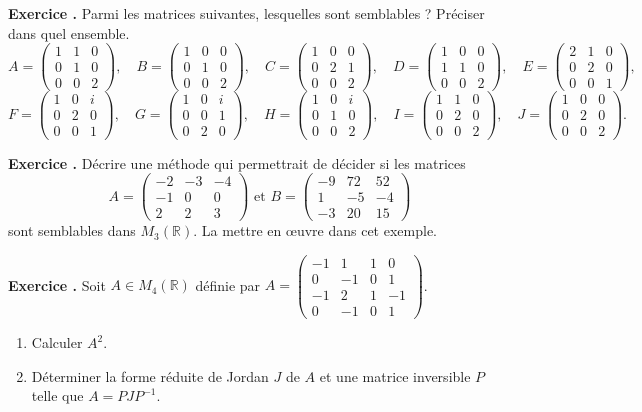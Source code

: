 \documentclass[10pt,a4paper]{article}
\def\bf#1{\textbf{#1}}
\newcounter{nexo}
\newcommand{\exo}{\medskip\noindent \bf{ Exercice \thenexo. \stepcounter{nexo}}}
\def\be{\begin{enumerate}}
\def\ee{\end{enumerate}}
\def\R{\mathbb{R}}
\def\mat#1{\begin{pmatrix}#1\end{pmatrix}}
\begin{document}
\exo
Parmi les matrices suivantes, lesquelles sont semblables ? Préciser dans quel ensemble.
%
\begin{equation*}
 A=\mat{1&1&0\\
0&1&0\\
0&0&2}, \quad
B = \mat{1&0&0\\
0&1&0\\
0&0&2},\quad
C = \mat{1&0&0\\
0&2&1\\
0&0&2},\quad
D = \mat{1&0&0\\
1&1&0\\
0&0&2},\quad
E = \mat{2&1&0\\
0&2&0\\
0&0&1},
\end{equation*}
\begin{equation*}
F = \mat{1&0&i\\
0&2&0\\
0&0&1},\quad
G = \mat{1&0&i\\
0&0&1\\
0&2&0},\quad
H = \mat{1&0&i\\
0&1&0\\
0&0&2},\quad
I =  \mat{1&1&0\\
0&2&0\\
0&0&2},\quad
J = \mat{1&0&0\\
0&2&0\\
0&0&2}.
\end{equation*}


\exo Décrire une méthode qui permettrait de décider si les matrices \\
%
\begin{equation*}
 A = \mat{-2&-3&-4\\
-1&0&0\\
2&2&3}
\mbox{ et }
B=\mat{-9&72&52\\
1&-5&-4\\
-3&20&15}
\end{equation*}
%
sont semblables dans $M_3(\R)$. La mettre en {\oe}uvre dans cet exemple.


\exo Soit $A\in M_4(\R)$ définie par 
$A=\mat{-1&1&1&0\\
0&-1&0&1\\
-1&2&1&-1\\
0&-1&0&1}$. \be
\item Calculer $A^2$.  
\item Déterminer la forme réduite de Jordan $J$ de $A$ et une matrice inversible $P$ telle que $A=P J P^{-1}$.
\ee
\end{document}
